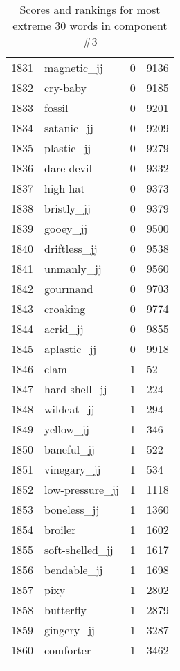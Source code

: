 \begin{longtable}[!htbp]{| rlr@{.}l |}
    1831 & magnetic\_jj & 0 & 9136 \\
    1832 & cry-baby & 0 & 9185 \\
    1833 & fossil & 0 & 9201 \\
    1834 & satanic\_jj & 0 & 9209 \\
    1835 & plastic\_jj & 0 & 9279 \\
    1836 & dare-devil & 0 & 9332 \\
    1837 & high-hat & 0 & 9373 \\
    1838 & bristly\_jj & 0 & 9379 \\
    1839 & gooey\_jj & 0 & 9500 \\
    1840 & driftless\_jj & 0 & 9538 \\
    1841 & unmanly\_jj & 0 & 9560 \\
    1842 & gourmand & 0 & 9703 \\
    1843 & croaking & 0 & 9774 \\
    1844 & acrid\_jj & 0 & 9855 \\
    1845 & aplastic\_jj & 0 & 9918 \\
    1846 & clam & 1 & 52 \\
    1847 & hard-shell\_jj & 1 & 224 \\
    1848 & wildcat\_jj & 1 & 294 \\
    1849 & yellow\_jj & 1 & 346 \\
    1850 & baneful\_jj & 1 & 522 \\
    1851 & vinegary\_jj & 1 & 534 \\
    1852 & low-pressure\_jj & 1 & 1118 \\
    1853 & boneless\_jj & 1 & 1360 \\
    1854 & broiler & 1 & 1602 \\
    1855 & soft-shelled\_jj & 1 & 1617 \\
    1856 & bendable\_jj & 1 & 1698 \\
    1857 & pixy & 1 & 2802 \\
    1858 & butterfly & 1 & 2879 \\
    1859 & gingery\_jj & 1 & 3287 \\
    1860 & comforter & 1 & 3462 \\
    \hline
    \caption{Scores and rankings for most extreme 30 words in component \#3} \\
\end{longtable}
